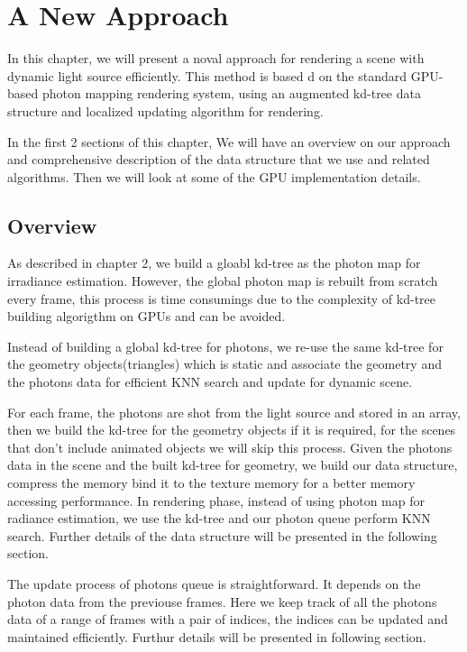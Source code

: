 \chapter{A New Approach}

In this chapter, we will present a noval approach for rendering a scene with dynamic light source efficiently. This method is based d on the standard GPU-based photon mapping rendering system, using an augmented kd-tree data structure and localized updating algorithm for rendering.  

In the first 2 sections of this chapter, We will have an overview on our approach and comprehensive description of the data structure that we use and related algorithms. Then we will look at some of the GPU implementation details. 

\section{Overview} 

As described in chapter 2, we build a gloabl kd-tree as the photon map for irradiance estimation. However, the global photon map is rebuilt from scratch every frame, this process is time consumings due to the complexity of kd-tree building algorigthm on GPUs and can be avoided. 

Instead of building a global kd-tree for photons, we re-use the same kd-tree for the geometry objects(triangles) which is static and associate the geometry and the photons data for efficient KNN search and update for dynamic scene. 

For each frame, the photons are shot from the light source and stored in an array, then we build the kd-tree for the geometry objects if it is required, for the scenes that don't include animated objects we will skip this process. Given the photons data in the scene and the built kd-tree for geometry, we build our data structure, compress the memory bind it to the texture memory for a better memory accessing performance. In rendering phase, instead of using photon map for radiance estimation, we use the kd-tree and our photon queue perform KNN search. Further details of the data structure will be presented in the following section. 

The update process of photons queue is straightforward. It depends on the photon data from the previouse frames. Here we keep track of all the photons data of a range of frames with a pair of indices, the indices can be updated and maintained efficiently. Furthur  details will be presented in following section.  

